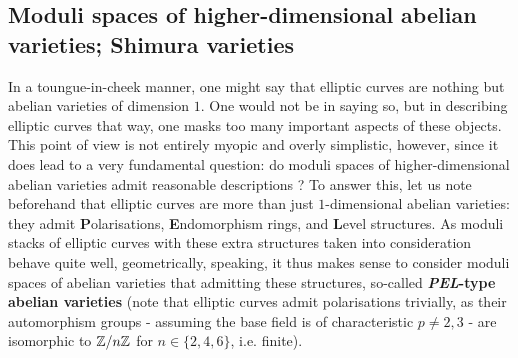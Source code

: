         \subsection{Moduli spaces of higher-dimensional abelian varieties; Shimura varieties}
            In a toungue-in-cheek manner, one might say that elliptic curves are nothing but abelian varieties of dimension $1$. One would not be in saying so, but in describing elliptic curves that way, one masks too many important aspects of these objects. This point of view is not entirely myopic and overly simplistic, however, since it does lead to a very fundamental question: do moduli spaces of higher-dimensional abelian varieties admit reasonable descriptions ? To answer this, let us note beforehand that elliptic curves are more than just $1$-dimensional abelian varieties: they admit \textbf{P}olarisations,  \textbf{E}ndomorphism rings, and \textbf{L}evel structures. As moduli stacks of elliptic curves with these extra structures taken into consideration behave quite well, geometrically, speaking, it thus makes sense to consider moduli spaces of abelian varieties that admitting these structures, so-called \textbf{\textit{PEL}-type abelian varieties} (note that elliptic curves admit polarisations trivially, as their automorphism groups - assuming the base field is of characteristic $p \not = 2, 3$ - are isomorphic to $\mathbb{Z}/n\mathbb{Z}$ for $n \in \{2, 4, 6\}$, i.e. finite). 
            
